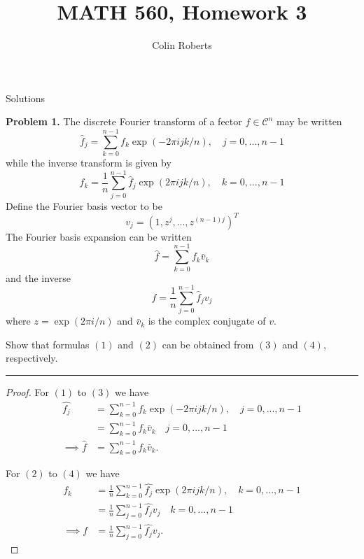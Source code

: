 \documentclass[leqno]{article}
\author{Colin Roberts}
\title{MATH 560, Homework 3}
\theoremstyle{nonumberplain}
\newtheorem{proof}{Proof}
\begin{document}
\maketitle
\begin{large}
\begin{center}
Solutions
\end{center}
\end{large}
\pagebreak

\noindent\textbf{Problem 1.} The discrete Fourier transform of a fector $f\in \mathcal{C}^n$ may be written
\begin{equation}
\hat{f}_j = \sum_{k=0}^{n-1} f_k \exp(-2\pi ijk/n), \textrm{~~~} j=0,...,n-1
\end{equation}
while the inverse transform is given by
\begin{equation}
f_k=\frac{1}{n}\sum_{j=0}^{n-1} \hat{f}_j \exp(2\pi ijk/n), \textrm{~~~} k=0,...,n-1
\end{equation}
Define the Fourier basis vector to be
\[
v_j=(1,z^j,...,z^{(n-1)j})^T
\]
The Fourier basis expansion can be written
\begin{equation}
\hat{f} = \sum_{k=0}^{n-1} f_k \bar{v}_k
\end{equation}
and the inverse
\begin{equation}
f=\frac{1}{n} \sum_{j=0}^{n-1} \hat{f}_j v_j
\end{equation}
where $z=\exp(2\pi i/n)$ and $\bar{v}_k$ is the complex conjugate of $v$.

Show that formulas $(1)$ and $(2)$ can be obtained from $(3)$ and $(4)$, respectively.

\noindent\rule[0.5ex]{\linewidth}{1pt}

\begin{proof}
For $(1)$ to $(3)$ we have
\begin{align*}
\hat{f_j} &= \sum_{k=0}^{n-1} f_k \exp(-2\pi ijk/n), \textrm{~~~} j=0,...,n-1\\
&=\sum_{k=0}^{n-1} f_k \bar{v}_k \textrm{~~~} j=0,...,n-1\\
\implies \hat{f}&=\sum_{k=0}^{n-1} f_k \bar{v}_k .
\end{align*}  

For $(2)$ to $(4)$ we have
\begin{align*}
f_k &= \frac{1}{n}\sum_{k=0}^{n-1} \hat{f_j} \exp(2\pi ijk/n), \textrm{~~~} k=0,...,n-1\\
&=\frac{1}{n}\sum_{j=0}^{n-1} \hat{f_j} v_j \textrm{~~~} k=0,...,n-1\\
\implies f&=\frac{1}{n}\sum_{j=0}^{n-1} \hat{f_j} v_j .
\end{align*}  
\end{proof}
\end{document}
